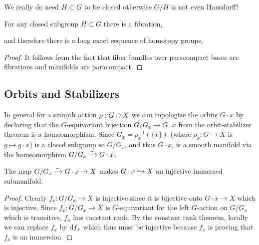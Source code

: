 \documentclass[12pt]{article}
\begin{document}
\begin{rmk}
We really do need $H \subset G$ to be closed otherwise $G/H$ is not even Hausdorff!
\end{rmk}

\begin{corollary}
For any closed subgroup $H \subset G$ there is a fibration,
\begin{center}
\end{center}
and therefore there is a long exact sequence of homotopy groups,
\begin{center}
\end{center}
\end{corollary}

\begin{proof}
It follows from the fact that fiber bundles over paracompact bases are fibrations and manifolds are paracompact.
\end{proof}

\subsection{Orbits and Stabilizers}

\begin{rmk}
In general for a smooth action $\rho : G \acts X$ we can topologize the orbits $G \cdot x$ by declaring that the $G$-equivariant bijection $G/G_x \to G \cdot x$ from the orbit-stabilizer theorem is a homeomorphism. Since $G_x = \rho_x^{-1}(\{ x \})$ (where $\rho_x : G \to X$ is $g \mapsto g \cdot x$) is a closed subgroup so $G/G_x$, and thus $G \cdot x$, is a smooth manifold via the homeomorphism $G / G_x \xrightarrow{\sim} G \cdot x$.
\end{rmk}

\begin{prop}
The map $G/G_x \xrightarrow{\sim} G \cdot x \to X$ makes $G \cdot x \hookrightarrow X$ an injective immersed submanifold.
\end{prop}

\begin{proof}
Clearly $f_x : G/G_x \to X$ is injective since it is bijective onto $G \cdot x \to X$ which is injective. Since $f_x : G/G_x \to X$ is $G$-equivariant for the left $G$-action on $G / G_x$ which is transitive, $f_x$ has constant rank. By the constant rank theorem, locally we can replace $f_x$ by $\mathrm{d}{f_x}$ which thus must be injective because $f_x$ is proving that $f_x$ is an immersion.
\end{proof}
\end{document}
